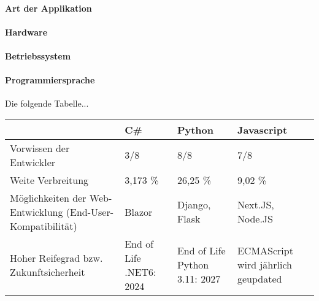




\paragraph*{Art der Applikation}

\paragraph*{Hardware}

\paragraph*{Betriebssystem}

\paragraph*{Programmiersprache}

Die folgende Tabelle...\\

\begin{tabular} {|m{3cm}|m{3cm}|m{3cm}|m{3cm}|}
\hline
 & C\# & Python & Javascript \\
\hline
Vorwissen der Entwickler & 3/8 & 8/8 & 7/8 \\
\hline
Weite Verbreitung & 3,173 \% & 26,25 \% & 9,02 \% \\
\hline
Möglichkeiten der Web-Entwicklung (End-User-Kompatibilität) & Blazor & Django, Flask & Next.JS, Node.JS \\
\hline
Hoher Reifegrad bzw. Zukunftsicherheit & End of Life .NET6: 2024 & End of Life Python 3.11: 2027 & ECMAScript wird jährlich geupdated \\
\hline
\end{tabular}

